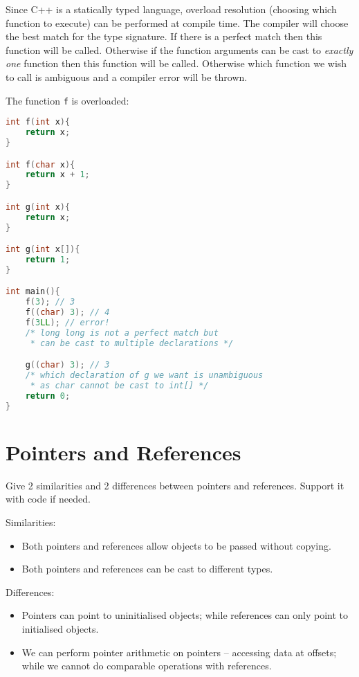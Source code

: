 \documentclass[10pt,\jkfside,a4paper]{article}
\begin{document}
Since C++ is a statically typed language, overload resolution (choosing
which function to execute) can be performed at compile time. The compiler
will choose the best match for the type signature. If there is a perfect
match then this function will be called. Otherwise if the function arguments
can be cast to \textit{exactly one} function then this function will be
called. Otherwise which function we wish to call is ambiguous and a compiler
error will be thrown.

The function \texttt{f} is overloaded:

\begin{lstlisting}[language=C++]
int f(int x){
	return x;
}

int f(char x){
	return x + 1;
}

int g(int x){
	return x;
}

int g(int x[]){
	return 1;
}

int main(){
	f(3); // 3
	f((char) 3); // 4
	f(3LL); // error!
	/* long long is not a perfect match but
	 * can be cast to multiple declarations */

	g((char) 3); // 3
	/* which declaration of g we want is unambiguous
	 * as char cannot be cast to int[] */
	return 0;
}

\end{lstlisting}

\section{Pointers and References}

Give 2 similarities and 2 differences between pointers and references.
Support it with code if needed.

Similarities:

\begin{itemize}

\item Both pointers and references allow objects to be passed without copying.

\item Both pointers and references can be cast to different types.

\end{itemize}

Differences:

\begin{itemize}

\item Pointers can point to uninitialised objects; while references can only
point to initialised objects.

\item We can perform pointer arithmetic on pointers -- accessing data at
offsets; while we cannot do comparable operations with references.

\end{itemize}
\end{document}
